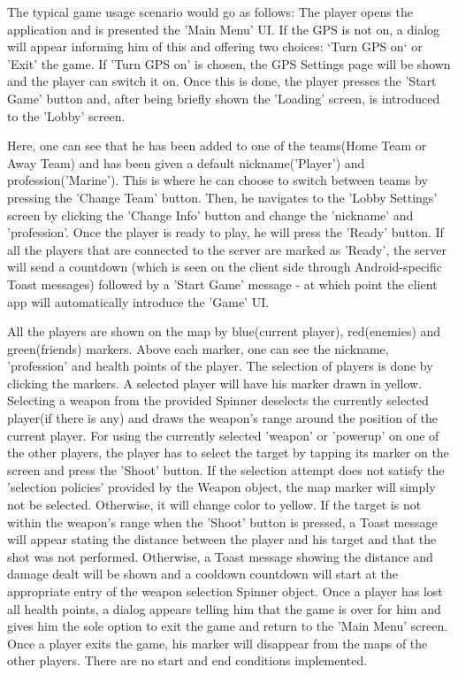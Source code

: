 The typical game usage scenario would go as follows: The player opens the
application and is presented the 'Main Menu' UI. If the GPS is not on, a dialog
will appear informing him of this and offering two choices: `Turn GPS on` or
'Exit' the game. If 'Turn GPS on' is chosen, the GPS Settings page will be shown
and the player can switch it on. Once this is done, the player presses the 
'Start Game' button and, after being briefly shown the 'Loading' screen, is
introduced to the 'Lobby' screen.\newline

Here, one can see that he has been added to one of the teams(Home Team or Away
Team) and has been given a default nickname('Player') and profession('Marine').
This is where he can choose to switch between teams by pressing the 'Change
Team' button. Then, he navigates to the 'Lobby Settings' screen by clicking the
'Change Info' button and change the 'nickname' and 'profession'. Once the player
is ready to play, he will press the 'Ready' button. If all the players that are
connected to the server are marked as 'Ready', the server will send a countdown
(which is seen on the client side through Android-specific Toast messages)
followed by a 'Start Game' message - at which point the client app will
automatically introduce the 'Game' UI. \newline

All the players are shown on the map by blue(current player), red(enemies) and
green(friends) markers. Above each marker, one can see the nickname,
'profession' and health points of the player. The selection of players is done
by clicking the markers. A selected player will have his marker drawn in yellow.
Selecting a weapon from the provided Spinner deselects the currently selected
player(if there is any) and draws the weapon's range around the position of the
current player. For using the currently selected 'weapon' or 'powerup' on one of
the other players, the player has to select the target by tapping its marker on
the screen and press the 'Shoot' button. If the selection attempt does not
satisfy the 'selection policies' provided by the Weapon object, the map marker
will simply not be selected. Otherwise, it will change color to yellow. If the
target is not within the weapon's range when the 'Shoot' button is pressed, a
Toast message will appear stating the distance between the player and his target
and that the shot was not performed. Otherwise, a Toast message showing the
distance and damage dealt will be shown and a cooldown countdown will start at
the appropriate entry of the weapon selection Spinner object. Once a player has
lost all health points, a dialog appears telling him that the game is over for
him and gives him the sole option to exit the game and return to the 'Main
Menu' screen. Once a player exits the game, his marker will disappear from the
maps of the other players. There are no start and end conditions implemented.

